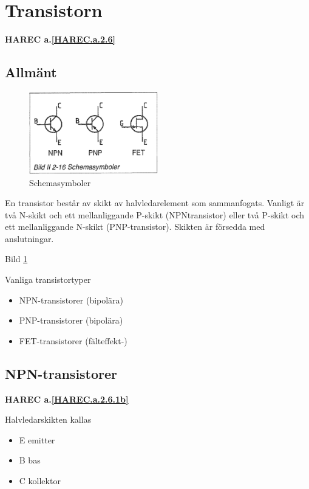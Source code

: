 \section{Transistorn}
\textbf{HAREC a.\ref{HAREC.a.2.6}\label{myHAREC.a.2.6}}
\label{transistorn}

\subsection{Allmänt}

\begin{figure}
\includegraphics[width=0.5\textwidth]{images/bild_2_2-16}
\caption{Schemasymboler}
\label{fig:BildII2-16}
\end{figure}

En transistor består av skikt av halvledarelement som sammanfogats. Vanligt är
två N-skikt och ett mellanliggande P-skikt (NPNtransistor) eller två P-skikt och
ett mellanliggande N-skikt (PNP-transistor). Skikten är försedda med
anslutningar.

Bild \ref{fig:BildII2-16}

Vanliga transistortyper
\begin{itemize}
\item NPN-transistorer (bipolära)
\item PNP-transistorer (bipolära)
\item FET-transistorer (fälteffekt-)
\end{itemize}

\subsection{NPN-transistorer}
\textbf{HAREC a.\ref{HAREC.a.2.6.1b}\label{myHAREC.a.2.6.1b}}

Halvledarskikten kallas
\begin{itemize}
\item E emitter
\item B bas
\item C kollektor
\end{itemize}

